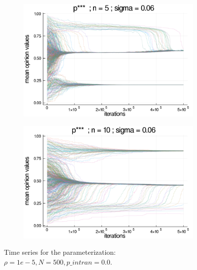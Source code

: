 \documentclass{article}
\begin{document}
\begin{figure}[H]
      \begin{subfigure}[b]{0.49\textwidth}
        \includegraphics[width=\textwidth]{img/series/tseries6/Poodlcalculatep***n5-rho10e-5-sigma006-00intransrandom.png}
      \end{subfigure}
            \begin{subfigure}[b]{0.49\textwidth}
        \includegraphics[width=\textwidth]{img/series/tseries6/Poodlcalculatep***n10-rho10e-5-sigma006-00intransrandom.png}
      \end{subfigure}
      \caption{Time series for the parameterization: \(\rho = 1e-5, N = 500,
        p\_intran = 0.0 \).}
  \label{fig:tseries6}
    \end{figure}
\end{document}
